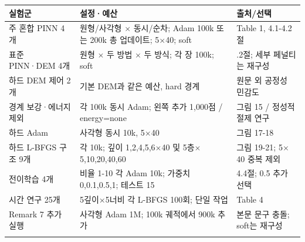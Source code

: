 \documentclass[10pt,a4paper]{article}
\begin{document}
\begingroup\small

\par\begin{minipage}{\linewidth}\begin{tabular}{>{\raggedright\arraybackslash}p{}>{\raggedright\arraybackslash}p{}>{\raggedright\arraybackslash}p{}}

\rowcolor{tint} \textbf{실험군} & \textbf{설정·예산} & \textbf{출처/선택}\\\midrule

주 혼합 PINN 4개 & 원형/사각형 $\times$ 동시/순차; Adam 100k 또는 200k 총 업데이트; 5$\times$40; soft & Table 1, 4.1-4.2절\\\addlinespace[2pt]

표준 PINN·DEM 4개 & 원형 $\times$ 두 방법 $\times$ 두 방식; 각 장 100k; soft & 4.1.2절; 세부 페널티는 재구성\\\addlinespace[2pt]

하드 DEM 제어 2개 & 기본 DEM과 같은 예산, hard 경계 & 원문 외 공정성 민감도\\\addlinespace[2pt]

경계 보강·에너지 제외 & 각 100k 동시 Adam; 왼쪽 추가 1,000점 / energy=none & 그림 15 / 정성적 절제 연구\\\addlinespace[2pt]

하드 Adam & 사각형 동시 10k, 5$\times$40 & 그림 17-18\\\addlinespace[2pt]

하드 L-BFGS 구조 9개 & 각 10k; 깊이 1,2,4,5,6$\times$40 및 5층$\times$5,10,20,40,60 & 그림 19-21; 5$\times$40 중복 제외\\\addlinespace[2pt]

전이학습 4개 & 비율 1-10 각 Adam 10k; 가중치 0,0.1,0.5,1; 테스트 15 & 4.4절; 0.5 추가 선택\\\addlinespace[2pt]

시간 연구 25개 & 5깊이$\times$5너비 각 L-BFGS 100회; 단일 작업 & Table 4\\\addlinespace[2pt]

Remark 7 추가 실행 & 사각형 Adam 1M; 100k 궤적에서 900k 추가 & 본문 문구 충돌; soft는 재구성\\\addlinespace[2pt]

\bottomrule\end{tabular}\end{minipage}\par\vspace{5pt}\endgroup
\end{document}
